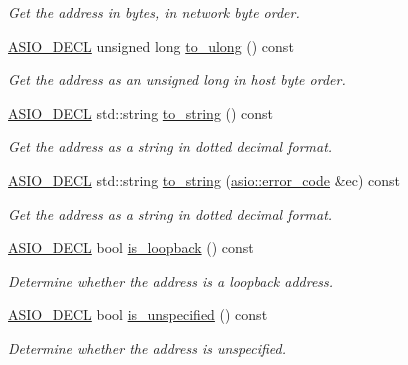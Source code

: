 \begin{DoxyCompactItemize}
\begin{DoxyCompactList}\small\item\em Get the address in bytes, in network byte order. \end{DoxyCompactList}\item 
\hyperlink{config_8hpp_ab54d01ea04afeb9a8b39cfac467656b7}{A\+S\+I\+O\+\_\+\+D\+E\+C\+L} unsigned long \hyperlink{classasio_1_1ip_1_1address__v4_aa18d668f476faf1d42a588efb7500209}{to\+\_\+ulong} () const 
\begin{DoxyCompactList}\small\item\em Get the address as an unsigned long in host byte order. \end{DoxyCompactList}\item 
\hyperlink{config_8hpp_ab54d01ea04afeb9a8b39cfac467656b7}{A\+S\+I\+O\+\_\+\+D\+E\+C\+L} std\+::string \hyperlink{classasio_1_1ip_1_1address__v4_a87f841ab4b6a80d7c4f9da995d677b30}{to\+\_\+string} () const 
\begin{DoxyCompactList}\small\item\em Get the address as a string in dotted decimal format. \end{DoxyCompactList}\item 
\hyperlink{config_8hpp_ab54d01ea04afeb9a8b39cfac467656b7}{A\+S\+I\+O\+\_\+\+D\+E\+C\+L} std\+::string \hyperlink{classasio_1_1ip_1_1address__v4_ace2550005793071b73ad79e4c4307a76}{to\+\_\+string} (\hyperlink{classasio_1_1error__code}{asio\+::error\+\_\+code} \&ec) const 
\begin{DoxyCompactList}\small\item\em Get the address as a string in dotted decimal format. \end{DoxyCompactList}\item 
\hyperlink{config_8hpp_ab54d01ea04afeb9a8b39cfac467656b7}{A\+S\+I\+O\+\_\+\+D\+E\+C\+L} bool \hyperlink{classasio_1_1ip_1_1address__v4_a7367152839634587f01cf703551fd4dd}{is\+\_\+loopback} () const 
\begin{DoxyCompactList}\small\item\em Determine whether the address is a loopback address. \end{DoxyCompactList}\item 
\hyperlink{config_8hpp_ab54d01ea04afeb9a8b39cfac467656b7}{A\+S\+I\+O\+\_\+\+D\+E\+C\+L} bool \hyperlink{classasio_1_1ip_1_1address__v4_afd781db79866ace8335bbe8a8d8f5d3f}{is\+\_\+unspecified} () const 
\begin{DoxyCompactList}\small\item\em Determine whether the address is unspecified. \end{DoxyCompactList}\item 

\end{DoxyCompactItemize}
